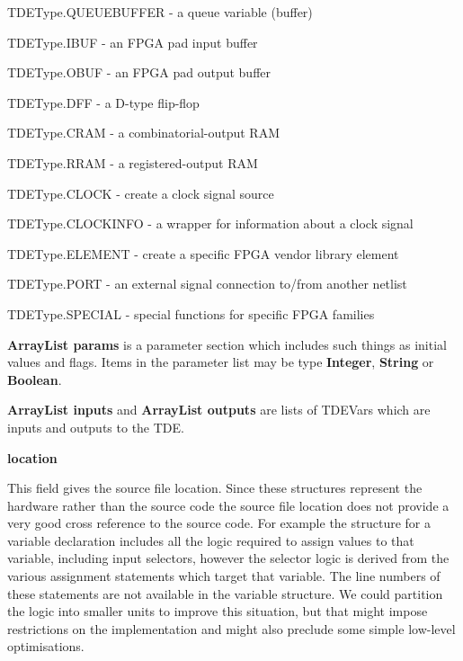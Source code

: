 \item   TDEType.QUEUEBUFFER - a queue variable (buffer)
\item   TDEType.IBUF -      an FPGA pad input buffer
\item   TDEType.OBUF -      an FPGA pad output buffer
\item   TDEType.DFF -       a D-type flip-flop
\item   TDEType.CRAM -      a combinatorial-output RAM
\item   TDEType.RRAM -      a registered-output RAM
\item   TDEType.CLOCK -     create a clock signal source
\item   TDEType.CLOCKINFO - a wrapper for information about a clock signal
\item   TDEType.ELEMENT -   create a specific FPGA vendor library element
\item   TDEType.PORT -      an external signal connection to/from another netlist
\item   TDEType.SPECIAL -   special functions for specific FPGA families
\blend

{\bf ArrayList params} is a parameter section which includes such
things as initial values and flags. Items in the parameter
list may be type {\bf Integer}, {\bf String} or {\bf
Boolean}.

{\bf ArrayList inputs} and {\bf ArrayList outputs} are lists of 
TDEVars which are inputs and outputs to the TDE.

{\bf location}

This field gives the source file location.
Since these structures represent the hardware rather than the
source code the source file location does not provide a very
good cross reference to the source code. For example the
structure for a variable declaration includes all the logic
required to assign values to that variable, including input
selectors, however the selector logic is derived from the
various assignment statements which target that variable. The
line numbers of these statements are not available in the
variable structure. We could partition the logic into smaller
units to improve this situation, but that might impose
restrictions on the implementation and might also preclude some
simple low-level optimisations.

